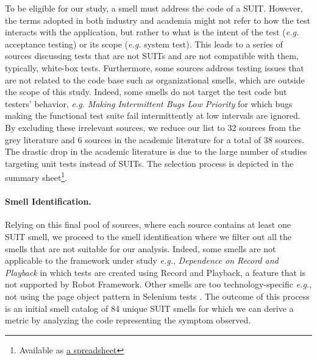 To be eligible for our study, a smell must address the code of a SUIT. However, the terms adopted in both industry and academia might not refer to how the test interacts with the application, but rather to what is the intent of the test (\emph{e.g.} acceptance testing) or its scope (\emph{e.g.} system test). This leads to a series of sources discussing tests that are not SUITs and are not compatible with them, typically, white-box tests. Furthermore, some sources address testing issues that are not related to the code base such as organizational smells, which are outside the scope of this study. Indeed, some smells do not target the test code but testers' behavior, \emph{e.g.} \emph{Making Intermittent Bugs Low Priority} \cite{StackExchange2017} for which bugs making the functional test suite fail intermittently at low intervals are ignored. By excluding these irrelevant sources, we reduce our list to 32 sources from the grey literature and 6 sources in the academic literature for a total of 38 sources. The drastic drop in the academic literature is due to the large number of studies targeting unit tests instead of SUITs.
The selection process is depicted in the summary sheet\footnote{Available as \href{https://docs.google.com/spreadsheets/d/e/2PACX-1vQ78jmOjU3qTOlGzwCSkidJOliPKNDQhmuOxSsfTaRqFVjmFP41JUbYQeupqU_lGCK6L4EpQ3FHNGhU/pubhtml}{a spreadsheet}}.

\paragraph{\textbf{Smell Identification.}}

Relying on this final pool of sources, where each source contains at least one SUIT smell, we proceed to the smell identification where we filter out all the smells that are not suitable for our analysis. Indeed, some smells are not applicable to the framework under study \emph{e.g.}, \emph{Dependence on Record and Playback} \cite{StackExchange2017} in which tests are created using Record and Playback, a feature that is not supported by Robot Framework. Other smells are too technology-specific \emph{e.g.}, not using the page object pattern in Selenium tests \cite{Advolodkin2018}. The outcome of this process is an initial smell catalog of 84 unique SUIT smells for which we can derive a metric by analyzing the code representing the symptom observed.


